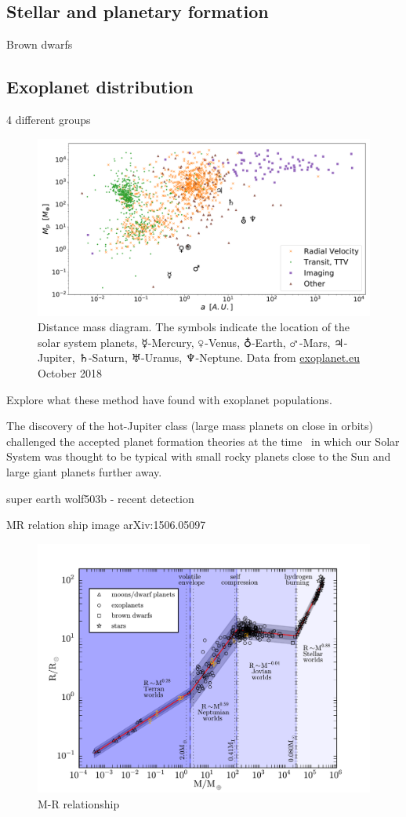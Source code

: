 \subsection{Stellar and planetary formation}

Brown dwarfs

\subsection{Exoplanet distribution} 4 different groups

\fref{}


\begin{figure}
    \centering
    \includegraphics[width=0.7\linewidth]{./figures/introduction/exoplanetEU_a_mass.pdf}
    \caption{Distance mass diagram. 
     The symbols indicate the location of the solar system planets, $\mercury$-Mercury, $\venus$-Venus, $\earth$-Earth, $\mars$-Mars, $\jupiter$-Jupiter, $\saturn$-Saturn, $\uranus$-Uranus, $\neptune$-Neptune. Data from \href{http://ww.exoplanet.eu}{exoplanet.eu} October 2018}
    \label{fig:pltoverlayadd}
\end{figure}


Explore what these method have found with exoplanet populations.

The discovery of the hot-Jupiter class (large mass planets on close in orbits) challenged the accepted planet formation theories at the time~\citep[.e.g][]{pollack_formation_1996} in which our Solar System was thought to be typical with small rocky planets close to the Sun and large giant planets further away.


super earth wolf503b - recent detection


MR relation ship image arXiv:1506.05097~\citet{chen_probabilistic_2016}

\begin{figure}
    \centering
    \includegraphics[width=0.4\linewidth]{./figures/introduction/mass_radius_relation.pdf}
    \caption{M-R relationship~\citet{chen_probabilistic_2016}}
    \label{fig:mass_radius_relation}
\end{figure}

